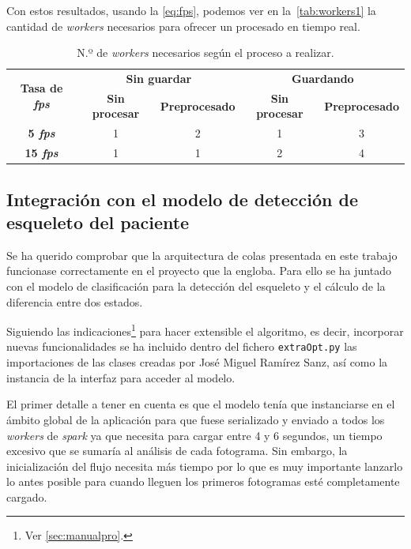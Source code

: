 Con estos resultados, usando la \autoref{eq:fps}, podemos ver en la~\autoref{tab:workers1} la cantidad de \textit{workers} necesarios para ofrecer un procesado en tiempo real.

\begin{table}[h]
	\begin{center}
		\begin{tabular}{c  c c c c  }
			\toprule
			\multirow{2}{1.5cm}{\textbf{Tasa de \textit{fps}}}& \multicolumn{2}{c}{\textbf{Sin guardar}} & \multicolumn{2}{c}{\textbf{Guardando}}\\
			& \textbf{Sin procesar} & \textbf{Preprocesado} & \textbf{Sin procesar} & \textbf{Preprocesado}\\
			\otoprule
			\textbf{5 \textit{fps}} & 1 & 2 &1 & 3\\
			\textbf{15 \textit{fps}} & 1 & 1 &2 & 4\\
			\bottomrule
		\end{tabular}
	\end{center}
	\caption{N.º de \textit{workers} necesarios según el proceso a realizar.}
	\label{tab:workers1}
\end{table}


\subsection{Integración con el modelo de detección de esqueleto del paciente}

Se ha querido comprobar que la arquitectura de colas presentada en este trabajo funcionase correctamente en el proyecto que la engloba. Para ello se ha juntado con el modelo de clasificación para la detección del esqueleto y el cálculo de la diferencia entre dos estados.

Siguiendo las indicaciones\footnote{Ver \autoref{sec:manualpro}.} para hacer extensible el algoritmo, es decir, incorporar nuevas funcionalidades se ha incluido dentro del fichero \texttt{extraOpt.py} las importaciones de las clases creadas por José Miguel Ramírez Sanz, así como la instancia de la interfaz para acceder al modelo.

El primer detalle a tener en cuenta es que el modelo tenía que instanciarse en el ámbito global de la aplicación para que fuese serializado y enviado a todos los \textit{workers} de \textit{spark} ya que necesita para cargar entre 4 y 6 segundos, un tiempo excesivo que se sumaría al análisis de cada fotograma. Sin embargo, la inicialización del flujo necesita más tiempo por lo que es muy importante lanzarlo lo antes posible para cuando lleguen los primeros fotogramas esté completamente cargado.

